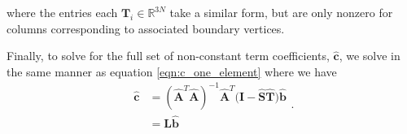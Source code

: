 where the entries each $\mathbf{T}_i \in \mathbb{R}^{3N}$ take a similar form, but are only nonzero for columns corresponding to associated boundary vertices.

Finally, to solve for the full set of non-constant term coefficients, $\hat{\mathbf{c}}$, we solve in the same manner as equation \ref{eqn:c_one_element} where we have
\begin{equation}
\label{eqn:c_multiple_elements}
\begin{split}
\hat{\mathbf{c}} & = (\hat{\mathbf{A}}^T\hat{\mathbf{A}})^{-1}\hat{\mathbf{A}}^T(\mathbf{I-\hat{S}\hat{T})\hat{\mathbf{b}}} \\
           & = \mathbf{L}\hat{\mathbf{b}}
\end{split}
\text{.}
\end{equation}

